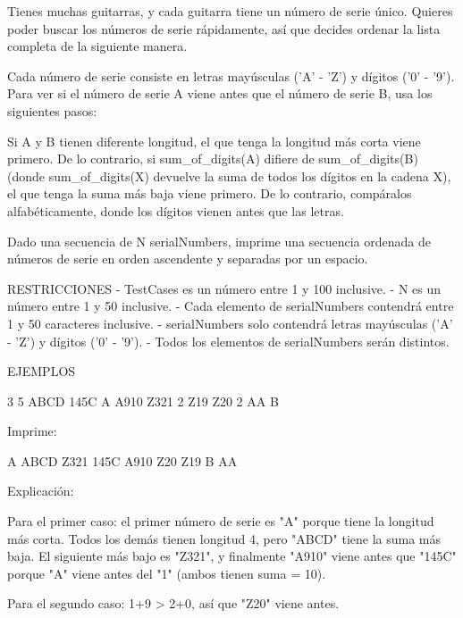 Tienes muchas guitarras, y cada guitarra tiene un número de serie único. Quieres poder buscar los números de serie rápidamente, así que decides ordenar la lista completa de la siguiente manera.

Cada número de serie consiste en letras mayúsculas ('A' - 'Z') y dígitos ('0' - '9'). Para ver si el número de serie A viene antes que el número de serie B, usa los siguientes pasos:

   Si A y B tienen diferente longitud, el que tenga la longitud más corta viene primero.
   De lo contrario, si sum_of_digits(A) difiere de sum_of_digits(B) (donde sum_of_digits(X) devuelve la suma de todos los dígitos en la cadena X), el que tenga la suma más baja viene primero.
   De lo contrario, compáralos alfabéticamente, donde los dígitos vienen antes que las letras.

Dado una secuencia de N serialNumbers, imprime una secuencia ordenada de números de serie en orden ascendente y separadas por un espacio.

RESTRICCIONES
- TestCases es un número entre 1 y 100 inclusive.
- N es un número entre 1 y 50 inclusive.
- Cada elemento de serialNumbers contendrá entre 1 y 50 caracteres inclusive.
- serialNumbers solo contendrá letras mayúsculas ('A' - 'Z') y dígitos ('0' - '9').
- Todos los elementos de serialNumbers serán distintos.

EJEMPLOS

3
5
ABCD
145C
A
A910
Z321
2
Z19
Z20
2
AA
B

Imprime:

A ABCD Z321 145C A910
Z20 Z19
B AA

Explicación:

Para el primer caso: el primer número de serie es "A" porque tiene la longitud más corta. Todos los demás tienen longitud 4, pero "ABCD" tiene la suma más baja. El siguiente más bajo es "Z321", y finalmente "A910" viene antes que "145C" porque "A" viene antes del "1" (ambos tienen suma = 10).

Para el segundo caso: 1+9 > 2+0, así que "Z20" viene antes.
